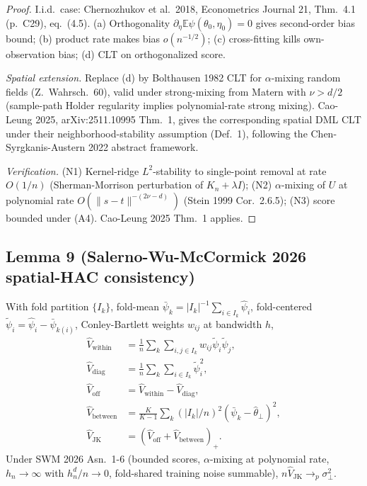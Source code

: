 \begin{proof}
I.i.d.\ case: Chernozhukov et al.\ 2018, Econometrics Journal 21, Thm.~4.1
(p.~C29), eq.~(4.5). (a) Orthogonality $\partial_\eta\mathbb E\psi(\theta_0,\eta_0)=0$
gives second-order bias bound; (b) product rate makes bias $o(n^{-1/2})$;
(c) cross-fitting kills own-observation bias; (d) CLT on orthogonalized score.

\emph{Spatial extension.} Replace (d) by Bolthausen 1982 CLT for $\alpha$-mixing
random fields (Z.~Wahrsch.~60), valid under strong-mixing from Matern with
$\nu>d/2$ (sample-path Holder regularity implies polynomial-rate strong mixing).
Cao-Leung 2025, arXiv:2511.10995 Thm.~1, gives the corresponding spatial DML
CLT under their neighborhood-stability assumption (Def.~1), following the
Chen-Syrgkanis-Austern 2022 abstract framework.

\emph{Verification.} (N1) Kernel-ridge $L^2$-stability to single-point removal
at rate $O(1/n)$ (Sherman-Morrison perturbation of $K_n+\lambda I$); (N2)
$\alpha$-mixing of $U$ at polynomial rate $O(\|s-t\|^{-(2\nu-d)})$ (Stein 1999
Cor.~2.6.5); (N3) score bounded under (A4). Cao-Leung 2025 Thm.~1 applies.
\end{proof}

\subsection*{Lemma 9 (Salerno-Wu-McCormick 2026 spatial-HAC consistency)}

\begin{lemma}\label{lem:swm}
With fold partition $\{I_k\}$, fold-mean $\bar\psi_k=|I_k|^{-1}\sum_{i\in I_k}\widehat\psi_i$,
fold-centered $\widetilde\psi_i=\widehat\psi_i-\bar\psi_{k(i)}$, Conley-Bartlett
weights $w_{ij}$ at bandwidth $h$,
\begin{align*}
\widehat V_{\mathrm{within}}&=\tfrac1n\sum_k\sum_{i,j\in I_k}w_{ij}\widetilde\psi_i\widetilde\psi_j,\\
\widehat V_{\mathrm{diag}}&=\tfrac1n\sum_k\sum_{i\in I_k}\widetilde\psi_i^2,\\
\widehat V_{\mathrm{off}}&=\widehat V_{\mathrm{within}}-\widehat V_{\mathrm{diag}},\\
\widehat V_{\mathrm{between}}&=\tfrac{K}{K-1}\sum_k(|I_k|/n)^2(\bar\psi_k-\widehat\theta_\perp)^2,\\
\widehat V_{\mathrm{JK}}&=(\widehat V_{\mathrm{off}}+\widehat V_{\mathrm{between}})_+.
\end{align*}
Under SWM 2026 Asn.~1-6 (bounded scores, $\alpha$-mixing at polynomial rate,
$h_n\to\infty$ with $h_n^d/n\to0$, fold-shared training noise summable),
$n\widehat V_{\mathrm{JK}}\to_p\sigma_\perp^2$.
\end{lemma}

